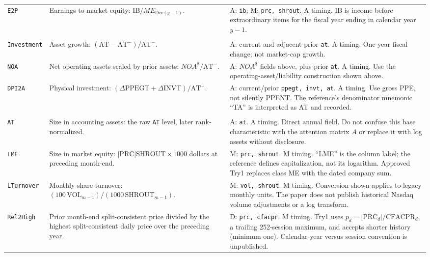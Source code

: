 \documentclass[11pt]{article}
\begin{document}
\begin{longtable}{@{}>{\raggedright\arraybackslash}p{}>{\raggedright\arraybackslash}p{}>{\raggedright\arraybackslash}p{}@{}}
\texttt{E2P} & Earnings to market equity: $\mathrm{IB}/ME_{\mathrm{Dec}(y-1)}$. & A: \texttt{ib}; M: \texttt{prc, shrout}. A timing. IB is income before extraordinary items for the fiscal year ending in calendar year $y-1$. \\
\addlinespace
\multicolumn{3}{@{}l}{\textbf{Investment: 3 characteristics}} \\*
\addlinespace
\texttt{Investment} & Asset growth: $(\mathrm{AT}-\mathrm{AT}^{-})/\mathrm{AT}^{-}$. & A: current and adjacent-prior \texttt{at}. A timing. One-year fiscal change; not market-cap growth. \\
\texttt{NOA} & Net operating assets scaled by prior assets: $NOA^{\$}/\mathrm{AT}^{-}$. & A: $NOA^{\$}$ fields above, plus prior \texttt{at}. A timing. Use the operating-asset/liability construction shown above. \\
\texttt{DPI2A} & Physical investment: $(\Delta\mathrm{PPEGT}+\Delta\mathrm{INVT})/\mathrm{AT}^{-}$. & A: current/prior \texttt{ppegt, invt, at}. A timing. Use gross PPE, not silently PPENT. The reference's denominator mnemonic ``TA'' is interpreted as AT and recorded. \\
\addlinespace
\multicolumn{3}{@{}l}{\textbf{Trading frictions: 10 characteristics}} \\*
\addlinespace
\texttt{AT} & Size in accounting assets: the raw \texttt{AT} level, later rank-normalized. & A: \texttt{at}. A timing. Direct annual field. Do not confuse this base characteristic with the attention matrix $A$ or replace it with log assets without disclosure. \\
\texttt{LME} & Size in market equity: $|\mathrm{PRC}|\mathrm{SHROUT}\times1000$ dollars at preceding month-end. & M: \texttt{prc, shrout}. M timing. ``LME'' is the column label; the reference defines capitalization, not its logarithm. Approved Try1 replaces class ME with the dated company sum. \\
\texttt{LTurnover} & Monthly share turnover: $(100\,\mathrm{VOL}_{m-1})/(1000\,\mathrm{SHROUT}_{m-1})$. & M: \texttt{vol, shrout}. M timing. Conversion shown applies to legacy monthly units. The paper does not publish historical Nasdaq volume adjustments or a log transform. \\
\texttt{Rel2High} & Prior month-end split-consistent price divided by the highest split-consistent daily price over the preceding year. & D: \texttt{prc, cfacpr}. M timing. Try1 uses $p_d=|\mathrm{PRC}_d|/\mathrm{CFACPR}_d$, a trailing 252-session maximum, and accepts shorter history (minimum one). Calendar-year versus session convention is unpublished. \\

\end{longtable}
\end{document}
